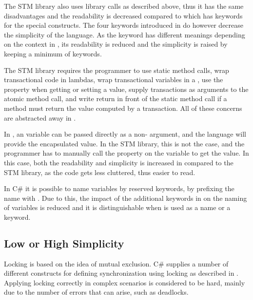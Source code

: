 The \ac{STM} library also uses library calls as described above, thus it has the same disadvantages and the readability is decreased compared to \stmname which has keywords for the special constructs. The four keywords introduced in \stmname do however decrease the simplicity of the language. As the  keyword has different meanings depending on the context in \stmname, its readability is reduced and the simplicity is raised by keeping a minimum of keywords. 

The \ac{STM} library requires the programmer to use static method calls, wrap transactional code in lambdas, wrap transactional variables in a , use the  property when getting or setting a value, supply  transactions as arguments to the atomic method call, and write return in front of the static method call if a method must return the value computed by a transaction. All of these concerns are abstracted away in \stmname.

In \stmname, an  variable can be passed directly as a non- argument, and the language will provide the encapsulated value. In the \ac{STM} library, this is not the case, and the programmer has to manually call the  property on the  variable to get the value. In this case, both the readability and simplicity is increased in \stmname compared to the \ac{STM} library, as the code gets less cluttered, thus easier to read.

In C\# it is possible to name variables by reserved keywords, by prefixing the name with . Due to this, the impact of the additional keywords in \stmname on the naming of variables is reduced and it is distinguishable when  is used as a name or a keyword.

\subsection{Low or High Simplicity}\label{subsec:simplicity}
Locking is based on the idea of mutual exclusion. C\# supplies a number of different constructs for defining synchronization using locking as described in . Applying locking correctly in complex scenarios is considered to be hard\cite[p. 56]{sutter2005software}, mainly due to the number of errors that can arise, such as deadlocks. 

